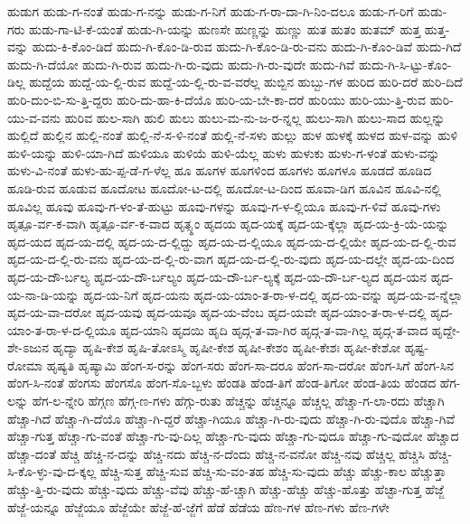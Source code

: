 {ಹುಡುಗ
ಹುಡು-ಗ-ನಂತೆ
ಹುಡು-ಗ-ನನ್ನು
ಹುಡು-ಗ-ನಿಗೆ
ಹುಡು-ಗ-ರಾ-ದಾ-ಗಿ-ನಿಂ-ದಲೂ
ಹುಡು-ಗ-ರಿಗೆ
ಹುಡು-ಗರು
ಹುಡು-ಗಾ-ಟಿ-ಕೆ-ಯಂತೆ
ಹುಡು-ಗಿ-ಯನ್ನು
ಹುಣಸೇ
ಹುಣ್ಣನ್ನು
ಹುಣ್ಣು
ಹುತ
ಹುತಂ
ಹುತಮ್
ಹುತ್ತ
ಹುತ್ತ-ವನ್ನು
ಹುದು-ಕಿ-ಕೊಂ-ಡಿದೆ
ಹುದು-ಗಿ-ಕೊಂ-ಡಿ-ರುವ
ಹುದು-ಗಿ-ಕೊಂ-ಡಿ-ರು-ವನು
ಹುದು-ಗಿ-ಕೊಂ-ಡಿವೆ
ಹುದು-ಗಿದೆ
ಹುದು-ಗಿ-ದೆಯೋ
ಹುದು-ಗಿ-ರುವ
ಹುದು-ಗಿ-ರು-ವುದು
ಹುದು-ಗಿ-ರು-ವುದೇ
ಹುದು-ಗಿವೆ
ಹುದು-ಗಿ-ಸಿ-ಟ್ಟು-ಕೊಂ-ಡಿಲ್ಲ
ಹುದ್ದೆಯ
ಹುದ್ದೆ-ಯ-ಲ್ಲಿ-ರುವ
ಹುದ್ದೆ-ಯ-ಲ್ಲಿ-ರು-ವ-ವರೆಲ್ಲ
ಹುಬ್ಬಿನ
ಹುಬ್ಬು-ಗಳ
ಹುರಿದ
ಹುರಿ-ದರೆ
ಹುರಿ-ದಿದೆ
ಹುರಿ-ದುಂ-ಬಿ-ಸು-ತ್ತಿ-ದ್ದರು
ಹುರಿ-ದು-ಹಾ-ಕಿ-ದೆಯೊ
ಹುರಿ-ಯ-ಬೇ-ಕಾ-ದರೆ
ಹುರಿಯು
ಹುರಿ-ಯು-ತ್ತಿ-ರುವ
ಹುರಿ-ಯು-ವ-ವನು
ಹುರಿವ
ಹುಲ-ಸಾಗಿ
ಹುಲಿ
ಹುಲು
ಹುಲು-ಮ-ನು-ಜ-ರ-ನ್ನಲ್ಲ
ಹುಲು-ಸಾಗಿ
ಹುಲು-ಸಾದ
ಹುಲ್ಲನ್ನು
ಹುಲ್ಲಿದೆ
ಹುಲ್ಲಿನ
ಹುಲ್ಲಿ-ನಂತೆ
ಹುಲ್ಲಿ-ನೆ-ಸ-ಳಿ-ನಂತೆ
ಹುಲ್ಲಿ-ನೆ-ಸಳು
ಹುಲ್ಲು
ಹುಳ
ಹುಳಕ್ಕೆ
ಹುಳದ
ಹುಳ-ವನ್ನು
ಹುಳಿ
ಹುಳಿ-ಯನ್ನು
ಹುಳಿ-ಯಾ-ಗಿದೆ
ಹುಳಿಯೂ
ಹುಳಿಯೆ
ಹುಳಿ-ಯೆಲ್ಲ
ಹುಳು
ಹುಳುಕು
ಹುಳು-ಗ-ಳಂತೆ
ಹುಳು-ವನ್ನು
ಹುಳು-ವಿ-ನಂತೆ
ಹುಳು-ಹು-ಪ್ಪ-ಡೆ-ಗ-ಳೆಲ್ಲ
ಹೂ
ಹೂಗಳ
ಹೂಗಳಿಂದ
ಹೂಗಳು
ಹೂಗಳೂ
ಹೂಡದೆ
ಹೂಡಿದ
ಹೂಡಿ-ರುವ
ಹೂಡುವ
ಹೂದೋಟ
ಹೂದೋ-ಟ-ದಲ್ಲಿ
ಹೂದೋ-ಟ-ದಿಂದ
ಹೂವಾ-ಡಿಗ
ಹೂವಿನ
ಹೂವಿ-ನಲ್ಲಿ
ಹೂವಿಲ್ಲ
ಹೂವು
ಹೂವು-ಗ-ಳಂ-ತೆ-ಹುಟ್ಟು
ಹೂವು-ಗಳನ್ನು
ಹೂವು-ಗ-ಳ-ಲ್ಲಿಯೂ
ಹೂವು-ಗ-ಳಿವೆ
ಹೂವು-ಗಳು
ಹೃತ್ಪೂ-ರ್ವ-ಕ-ವಾಗಿ
ಹೃತ್ಪೂ-ರ್ವ-ಕ-ವಾದ
ಹೃತ್ಸ್ಥಂ
ಹೃದಯ
ಹೃದ-ಯಕ್ಕೆ
ಹೃದ-ಯ-ಕ್ಕೆಲ್ಲಾ
ಹೃದ-ಯ-ಕ್ರಿ-ಯೆ-ಯನ್ನು
ಹೃದ-ಯದ
ಹೃದ-ಯ-ದಲ್ಲಿ
ಹೃದ-ಯ-ದ-ಲ್ಲಿದ್ದು
ಹೃದ-ಯ-ದ-ಲ್ಲಿಯೂ
ಹೃದ-ಯ-ದ-ಲ್ಲಿಯೇ
ಹೃದ-ಯ-ದ-ಲ್ಲಿ-ರುವ
ಹೃದ-ಯ-ದ-ಲ್ಲಿ-ರು-ವನು
ಹೃದ-ಯ-ದ-ಲ್ಲಿ-ರು-ವಾಗ
ಹೃದ-ಯ-ದ-ಲ್ಲಿ-ರು-ವುದು
ಹೃದ-ಯ-ದಲ್ಲೇ
ಹೃದ-ಯ-ದಿಂದ
ಹೃದ-ಯ-ದೌ-ರ್ಬಲ್ಯ
ಹೃದ-ಯ-ದೌ-ರ್ಬಲ್ಯಂ
ಹೃದ-ಯ-ದೌ-ರ್ಬ-ಲ್ಯಕ್ಕೆ
ಹೃದ-ಯ-ದೌ-ರ್ಬ-ಲ್ಯದ
ಹೃದ-ಯನ
ಹೃದ-ಯ-ನಾ-ಡಿ-ಯನ್ನು
ಹೃದ-ಯ-ನಿಗೆ
ಹೃದ-ಯನು
ಹೃದ-ಯ-ಯಾಂ-ತ-ರಾ-ಳ-ದಲ್ಲಿ
ಹೃದ-ಯ-ವನ್ನು
ಹೃದ-ಯ-ವ-ನ್ನೆಲ್ಲಾ
ಹೃದ-ಯ-ವಾ-ದರೋ
ಹೃದ-ಯವು
ಹೃದ-ಯವೂ
ಹೃದ-ಯ-ವೆಂಬ
ಹೃದ-ಯವೇ
ಹೃದ-ಯಾಂ-ತ-ರಾ-ಳ-ದಲ್ಲಿ
ಹೃದ-ಯಾಂ-ತ-ರಾ-ಳ-ದ-ಲ್ಲಿಯೂ
ಹೃದ-ಯಾನಿ
ಹೃದಯಿ
ಹೃದಿ
ಹೃದ್ಗ-ತ-ವಾ-ಗಿರ
ಹೃದ್ಗ-ತ-ವಾ-ಗಿಲ್ಲ
ಹೃದ್ಗ-ತ-ವಾದ
ಹೃದ್ದೇ-ಶೇ-ಽಜುನ
ಹೃದ್ಯಾ
ಹೃಷಿ-ಕೇಶ
ಹೃಷಿ-ತೋಽಸ್ಮಿ
ಹೃಷೀ-ಕೇಶ
ಹೃಷೀ-ಕೇಶಂ
ಹೃಷೀ-ಕೇಶಃ
ಹೃಷೀ-ಕೇಶೋ
ಹೃಷ್ಟ-ರೋಮಾ
ಹೃಷ್ಯತಿ
ಹೃಷ್ಯಾಮಿ
ಹೆಂಗ-ಸ-ರನ್ನು
ಹೆಂಗ-ಸರು
ಹೆಂಗ-ಸಾ-ದರೂ
ಹೆಂಗ-ಸಾ-ದರೋ
ಹೆಂಗ-ಸಿಗೆ
ಹೆಂಗ-ಸಿನ
ಹೆಂಗ-ಸಿ-ನಂತೆ
ಹೆಂಗಸು
ಹೆಂಗಸೊ
ಹೆಂಗ-ಸೊ-ಬ್ಬಳು
ಹೆಂಡತಿ
ಹೆಂಡ-ತಿಗೆ
ಹೆಂಡ-ತಿಗೋ
ಹೆಂಡ-ತಿಯ
ಹೆಂಡದ
ಹೆಗ-ಲನ್ನು
ಹೆಗ-ಲ-ನ್ನೇರಿ
ಹೆಗ್ಗಣ
ಹೆಗ್ಗ-ಣ-ಗಳು
ಹೆಗ್ಗು-ರುತು
ಹೆಚ್ಚನ್ನು
ಹೆಚ್ಚನ್ನೂ
ಹೆಚ್ಚಲ್ಲ
ಹೆಚ್ಚಾ-ಗ-ಲಾ-ರದು
ಹೆಚ್ಚಾಗಿ
ಹೆಚ್ಚಾ-ಗಿದೆ
ಹೆಚ್ಚಾ-ಗಿ-ದೆಯೊ
ಹೆಚ್ಚಾ-ಗಿ-ದ್ದರೆ
ಹೆಚ್ಚಾ-ಗಿಯೂ
ಹೆಚ್ಚಾ-ಗಿ-ರು-ವುದು
ಹೆಚ್ಚಾ-ಗಿ-ರು-ವುದೊ
ಹೆಚ್ಚಾ-ಗಿವೆ
ಹೆಚ್ಚಾ-ಗುತ್ತ
ಹೆಚ್ಚಾ-ಗು-ವಂತೆ
ಹೆಚ್ಚಾ-ಗು-ವು-ದಿಲ್ಲ
ಹೆಚ್ಚಾ-ಗು-ವುದು
ಹೆಚ್ಚಾ-ಗು-ವುದೂ
ಹೆಚ್ಚಾ-ಗು-ವುದೋ
ಹೆಚ್ಚಾದ
ಹೆಚ್ಚಾ-ದಂತೆ
ಹೆಚ್ಚಿ
ಹೆಚ್ಚಿ-ನ-ದನ್ನು
ಹೆಚ್ಚಿ-ನದು
ಹೆಚ್ಚಿ-ನ-ದೆಂದು
ಹೆಚ್ಚಿ-ನ-ವನೋ
ಹೆಚ್ಚಿ-ನವು
ಹೆಚ್ಚಿಲ್ಲ
ಹೆಚ್ಚಿಸಿ
ಹೆಚ್ಚಿ-ಸಿ-ಕೊ-ಳ್ಳು-ವು-ದ-ಕ್ಕಲ್ಲ
ಹೆಚ್ಚಿ-ಸುತ್ತ
ಹೆಚ್ಚಿ-ಸುವ
ಹೆಚ್ಚಿ-ಸು-ವಂ-ತಹ
ಹೆಚ್ಚಿ-ಸು-ವುದು
ಹೆಚ್ಚು
ಹೆಚ್ಚು-ಕಾಲ
ಹೆಚ್ಚುತ್ತಾ
ಹೆಚ್ಚು-ತ್ತಿ-ರು-ವುದು
ಹೆಚ್ಚು-ವುದು
ಹೆಚ್ಚು-ವೆವು
ಹೆಚ್ಚು-ಹೆ-ಚ್ಚಾಗಿ
ಹೆಚ್ಚು-ಹೆಚ್ಚು
ಹೆಚ್ಚು-ಹೊತ್ತು
ಹೆಚ್ಟಾ-ಗುತ್ತ
ಹೆಜ್ಜೆ
ಹೆಜ್ಜೆ-ಯನ್ನೂ
ಹೆಜ್ಜೆಯೂ
ಹೆಜ್ಜೆಯೇ
ಹೆಜ್ಜೆ-ಹೆ-ಜ್ಜೆಗೆ
ಹೆಡೆ
ಹೆಡೆಯ
ಹೆಣ-ಗಳ
ಹೆಣ-ಗಳು
ಹೆಣ-ಗಳೇ
}
